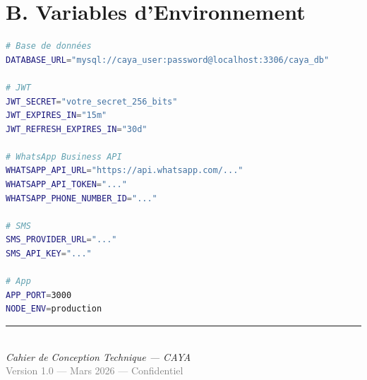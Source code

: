 \documentclass[12pt, a4paper]{report}
\begin{document}
\section*{B. Variables d'Environnement}

\begin{lstlisting}[language=bash, caption={.env NestJS}]
# Base de données
DATABASE_URL="mysql://caya_user:password@localhost:3306/caya_db"

# JWT
JWT_SECRET="votre_secret_256_bits"
JWT_EXPIRES_IN="15m"
JWT_REFRESH_EXPIRES_IN="30d"

# WhatsApp Business API
WHATSAPP_API_URL="https://api.whatsapp.com/..."
WHATSAPP_API_TOKEN="..."
WHATSAPP_PHONE_NUMBER_ID="..."

# SMS
SMS_PROVIDER_URL="..."
SMS_API_KEY="..."

# App
APP_PORT=3000
NODE_ENV=production
\end{lstlisting}

\vfill
\begin{center}
  \textcolor{cayaBlue}{\rule{0.5\textwidth}{0.4pt}}\\[0.3cm]
  {\small\textit{Cahier de Conception Technique — CAYA}}\\
  {\small\textcolor{gray}{Version 1.0 — Mars 2026 — Confidentiel}}
\end{center}
\end{document}
